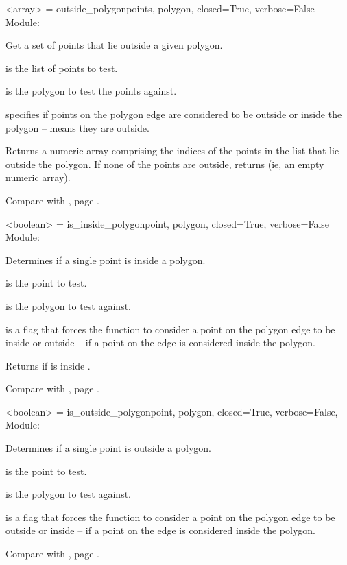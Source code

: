 \documentclass{manual}
\begin{document}
\label{ref:function_outside_polygon}
\begin{funcdesc}{<array> = outside_polygon}{points, polygon, closed=True, verbose=False}
Module: 

Get a set of points that lie outside a given polygon.

 is the list of points to test.

 is the polygon to test the points against.

 specifies if points on the polygon edge are considered to be outside
or inside the polygon --  means they are outside.

Returns a numeric array comprising the indices of the points in the list
that lie outside the polygon.  If none of the points are outside, returns
 (ie, an empty numeric array).

Compare with , page \pageref{ref:function_inside_polygon}.
\end{funcdesc}

\label{ref:function_is_inside_polygon}
\begin{funcdesc}{<boolean> = is_inside_polygon}{point, polygon, closed=True, verbose=False}
Module: 

Determines if a single point is inside a polygon.

 is the point to test.

 is the polygon to test  against.

 is a flag that forces the function to consider a point on the polygon
edge to be inside or outside -- if  a point on the edge is considered inside the
polygon.

Returns  if  is inside .

Compare with , page \pageref{ref:function_inside_polygon}.
\end{funcdesc}

\label{ref:function_is_outside_polygon}
\begin{funcdesc}{<boolean> = is_outside_polygon}{point, polygon, closed=True, verbose=False,
                                                }
Module: 

Determines if a single point is outside a polygon.

 is the point to test.

 is the polygon to test  against.

  is a flag that forces the function to consider a point on the polygon
edge to be outside or inside -- if  a point on the edge is considered inside the
polygon.

%

Compare with , page \pageref{ref:function_outside_polygon}.
\end{funcdesc}
\end{document}
